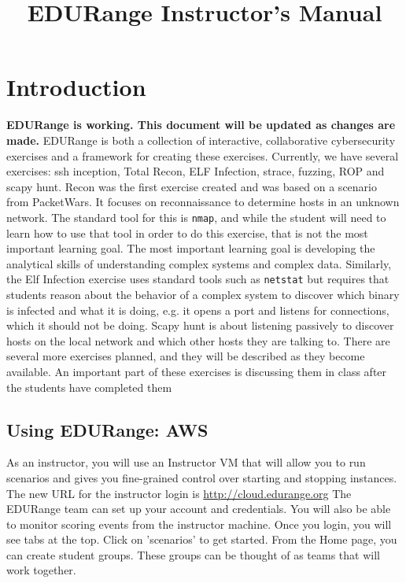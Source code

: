 \documentclass[11pt]{report}
\begin{document}
\title{EDURange Instructor's Manual}
\maketitle

%  
\section{Introduction}
\label{sec:intro}
{\bf  EDURange is working.  This document will be updated as changes are made.}
EDURange is both a collection of interactive, collaborative cybersecurity exercises and a framework 
for creating these exercises.  Currently, we have several exercises:  ssh inception, Total Recon, ELF Infection, strace, fuzzing, ROP and scapy hunt.
Recon was the first exercise created and was based on a scenario from PacketWars.  It
focuses on reconnaissance to determine hosts in an unknown network.  The standard tool for this is 
{\tt nmap}, and while the student will need to learn how to use that tool in order to do this exercise, 
that is
not the most important learning goal. The most important learning goal is developing the
analytical skills of understanding complex systems and complex data.  Similarly, the Elf Infection 
exercise uses standard tools such as {\tt netstat} but requires that students
reason about the behavior of a complex system to discover which binary is infected and 
what it is doing, e.g.
it opens a port and listens for connections, which it should not be doing.  
Scapy hunt is about listening passively to discover hosts on the local network and 
which other hosts they are talking to.
There are several more exercises planned, and they will be described as they become available.
An important part of these exercises is discussing them in class after the students have 
completed them



\subsection{Using EDURange: AWS}
As an instructor, you will use an Instructor VM that will allow you to run scenarios
and gives you fine-grained control over starting and stopping instances.
The new URL for the instructor login is \url{http://cloud.edurange.org}
The EDURange team can set up your account and credentials.
You will also be able to monitor scoring events from the instructor machine.
Once you login, you will see tabs at the top.  Click on 'scenarios' to get started.
From the Home page,  you can create student groups.  These groups can be thought of as teams that will work
together. %
\end{document}
